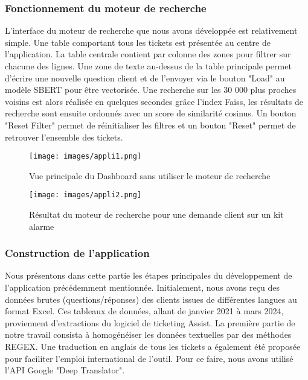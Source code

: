 \documentclass[12pt]{article}
\theoremstyle{definition}
\begin{document}
\subsubsection{Fonctionnement du moteur de recherche}

L'interface du moteur de recherche que nous avons développée est relativement simple. Une table comportant tous les tickets est présentée au centre de l’application. La table centrale contient par colonne des zones pour filtrer sur chacune des lignes. Une zone de texte au-dessus de la table principale permet d’écrire une nouvelle question client et de l'envoyer via le bouton "Load" au modèle SBERT pour être vectorisée. Une recherche sur les 30 000 plus proches voisins est alors réalisée en quelques secondes grâce l'index Faiss, les résultats de recherche sont ensuite ordonnés avec un score de similarité cosinus. Un bouton "Reset Filter" permet de réinitialiser les filtres et un bouton "Reset" permet de retrouver l’ensemble des tickets.

\begin{figure*}[!h]
	\centering
	\texttt{[image: images/appli1.png]}
	\caption{Vue principale du Dashboard sans utiliser le moteur de recherche}
\end{figure*}


\begin{figure*}[!h]
	\centering
	\texttt{[image: images/appli2.png]}
	\caption{Résultat du moteur de recherche pour une demande client sur un kit alarme}
\end{figure*}

\subsubsection{Construction de l'application}

Nous présentons dans cette partie les étapes principales du développement de l’application précédemment mentionnée. Initialement, nous avons reçu des données brutes (questions/réponses) des clients issues de différentes langues au format Excel. Ces tableaux de données, allant de janvier 2021 à mars 2024, proviennent d’extractions du logiciel de ticketing Assist. La première partie de notre travail consista à homogénéiser les données textuelles par des méthodes REGEX. Une traduction en anglais de tous les tickets a également été proposée pour faciliter l'emploi international de l'outil. Pour ce faire, nous avons utilisé l’API Google "Deep Translator".

\newpage 
\end{document}
